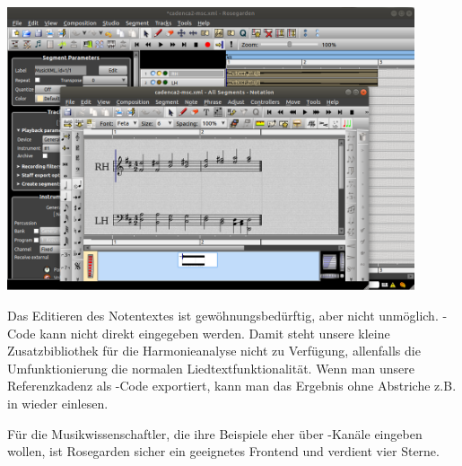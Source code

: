 \begin{center}
\includegraphics[width=0.9\textwidth]{frontends/rosegarden/rosegarden-cadenca2-300dpi.png}
\end{center}

Das Editieren des Notentextes ist gewöhnungsbedürftig, aber nicht unmöglich.
-Code kann nicht direkt eingegeben werden. Damit steht unsere
kleine Zusatzbibliothek für die Harmonieanalyse nicht zu Verfügung, allenfalls
die Umfunktionierung die normalen Liedtextfunktionalität. Wenn man unsere
Referenzkadenz als -Code exportiert, kann man das Ergebnis ohne
Abstriche z.B. in  wieder einlesen.

Für die Musikwissenschaftler, die ihre Beispiele eher über -Kanäle
eingeben wollen, ist Rosegarden sicher ein geeignetes Frontend und verdient vier Sterne.


%
